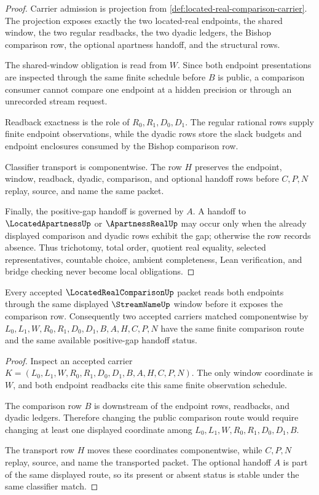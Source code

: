 \begin{proof}
Carrier admission is projection from \autoref{def:located-real-comparison-carrier}. The projection exposes exactly the two located-real endpoints, the shared window, the two regular readbacks, the two dyadic ledgers, the Bishop comparison row, the optional apartness handoff, and the structural rows.

The shared-window obligation is read from $W$. Since both endpoint presentations are inspected through the same finite schedule before $B$ is public, a comparison consumer cannot compare one endpoint at a hidden precision or through an unrecorded stream request.

Readback exactness is the role of $R_0,R_1,D_0,D_1$. The regular rational rows supply finite endpoint observations, while the dyadic rows store the slack budgets and endpoint enclosures consumed by the Bishop comparison row.

Classifier transport is componentwise. The row $H$ preserves the endpoint, window, readback, dyadic, comparison, and optional handoff rows before $C,P,N$ replay, source, and name the same packet.

Finally, the positive-gap handoff is governed by $A$. A handoff to $\LocatedApartnessUp$ or $\ApartnessRealUp$ may occur only when the already displayed comparison and dyadic rows exhibit the gap; otherwise the row records absence. Thus trichotomy, total order, quotient real equality, selected representatives, countable choice, ambient completeness, Lean verification, and bridge checking never become local obligations.
\end{proof}

\begin{theorem}
\label{thm:located-real-comparison-window-stability}
Every accepted $\LocatedRealComparisonUp$ packet reads both endpoints through the same displayed $\StreamNameUp$ window before it exposes the comparison row. Consequently two accepted carriers matched componentwise by $L_0,L_1,W,R_0,R_1,D_0,D_1,B,A,H,C,P,N$ have the same finite comparison route and the same available positive-gap handoff status.
\end{theorem}
\begin{proof}
Inspect an accepted carrier $K=(L_0,L_1,W,R_0,R_1,D_0,D_1,B,A,H,C,P,N)$. The only window coordinate is $W$, and both endpoint readbacks cite this same finite observation schedule.

The comparison row $B$ is downstream of the endpoint rows, readbacks, and dyadic ledgers. Therefore changing the public comparison route would require changing at least one displayed coordinate among $L_0,L_1,W,R_0,R_1,D_0,D_1,B$.

The transport row $H$ moves these coordinates componentwise, while $C,P,N$ replay, source, and name the transported packet. The optional handoff $A$ is part of the same displayed route, so its present or absent status is stable under the same classifier match.
\end{proof}


